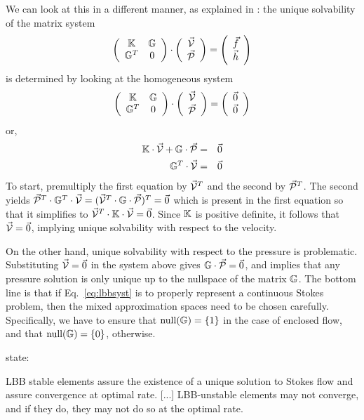 We can look at this in a different manner, as explained in \textcite{elsw}:
the unique solvability of the matrix system
\begin{equation}
\left(
\begin{array}{cc}
{\mathbb{K}} & {\mathbb{G}} \\
{\mathbb{G}}^T & 0 
\end{array}
\right)
\cdot 
\left(
\begin{array}{c}
\vec{\cal V} \\ \vec{\cal P}
\end{array}
\right)
=
\left(
\begin{array}{c}
\vec{f} \\ \vec{h}
\end{array}
\right)
\label{eq:lbbsyst}
\end{equation}
is determined by looking at the homogeneous system
\begin{equation}
\left(
\begin{array}{cc}
{\mathbb{K}} & {\mathbb{G}} \\
{\mathbb{G}}^T & 0 
\end{array}
\right)
\cdot 
\left(
\begin{array}{c}
\vec{\cal V} \\ \vec{\cal P}
\end{array}
\right)
=
\left(
\begin{array}{c}
\vec{0} \\ \vec{0}
\end{array}
\right)
\end{equation}
or,
\begin{eqnarray}
{\mathbb{K}} \cdot \vec{\cal V} + {\mathbb{G}} \cdot \vec{\cal P} &=& \vec{0} \nonumber\\
{\mathbb{G}}^T \cdot \vec{\cal V} &=& \vec{0}
\end{eqnarray}
To start, premultiply the first equation by $\vec{\cal V}^T$ and the second by 
$\vec{\cal P}^T$. The second yields
$\vec{\cal P}^T \cdot {\mathbb{G}}^T \cdot \vec{\cal V} = ( \vec{\cal V}^T \cdot {\mathbb{G}}\cdot \vec{\cal P}  )^T = \vec{0}$
which is present in the first equation so that it simplifies to $\vec{\cal V}^T\cdot {\mathbb{K}} \cdot \vec{\cal V} = \vec{0}$.
Since ${\mathbb{K}}$ is positive definite, it follows that $\vec{\cal V}=\vec{0}$, implying unique solvability
with respect to the velocity. 

On the other hand, unique solvability with respect to the pressure is problematic. Substituting $\vec{\cal V}=\vec{0}$
in the system above gives ${\mathbb{G}} \cdot \vec{\cal P} = \vec{0}$, and implies that any pressure solution is only unique 
up to the nullspace of the matrix ${\mathbb{G}}$. 
The bottom line is that if Eq.~\eqref{eq:lbbsyst} is to properly represent a continuous Stokes
problem, then the mixed approximation spaces need to be chosen carefully.
Specifically, we have to ensure that $\text{null}({\mathbb{G}})=\{1\}$ in the case of enclosed flow,
and that $\text{null}({\mathbb{G}})=\{0\}$, otherwise.

\textcite{grsa} state: 
\begin{displayquote}
{\color{darkgray}
LBB stable elements assure the existence of a unique solution to Stokes flow and 
assure convergence at optimal rate. [...] LBB-unstable elements may not converge, 
and if they do, they may not do so at the optimal rate.
}
\end{displayquote}
